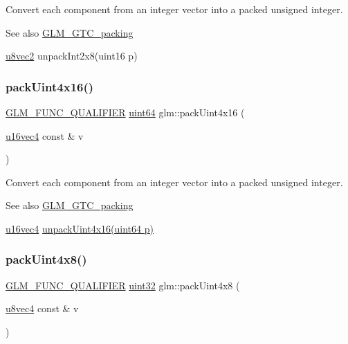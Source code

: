 Convert each component from an integer vector into a packed unsigned integer.

\begin{DoxySeeAlso}{See also}
\hyperlink{group__gtc__packing}{G\+L\+M\+\_\+\+G\+T\+C\+\_\+packing} 

\hyperlink{group__gtc__type__precision_ga01e28d0272428f94d22ea6111f0112be}{u8vec2} unpack\+Int2x8(uint16 p) 
\end{DoxySeeAlso}
\mbox{\label{group__gtc__packing_ga19813cb34dd7102f9612ba6c0d9ef377}} 
\subsubsection{\texorpdfstring{pack\+Uint4x16()}{packUint4x16()}}
{\footnotesize\ttfamily \hyperlink{setup_8hpp_a33fdea6f91c5f834105f7415e2a64407}{G\+L\+M\+\_\+\+F\+U\+N\+C\+\_\+\+Q\+U\+A\+L\+I\+F\+I\+ER} \hyperlink{group__gtc__type__precision_gae3632bf9b37da66233d78930dd06378a}{uint64} glm\+::pack\+Uint4x16 (\begin{DoxyParamCaption}\item[{\hyperlink{group__gtc__type__precision_ga049d45ad8d0f78578d7ceb86a7fdaae4}{u16vec4} const \&}]{v }\end{DoxyParamCaption})}

Convert each component from an integer vector into a packed unsigned integer.

\begin{DoxySeeAlso}{See also}
\hyperlink{group__gtc__packing}{G\+L\+M\+\_\+\+G\+T\+C\+\_\+packing} 

\hyperlink{group__gtc__type__precision_ga049d45ad8d0f78578d7ceb86a7fdaae4}{u16vec4} \hyperlink{group__gtc__packing_gaf1eea82404af955004aae19a2dcb55f1}{unpack\+Uint4x16(uint64 p)} 
\end{DoxySeeAlso}
\mbox{\label{group__gtc__packing_gaeb4262f799821affa62edf7067deaef9}} 
\subsubsection{\texorpdfstring{pack\+Uint4x8()}{packUint4x8()}}
{\footnotesize\ttfamily \hyperlink{setup_8hpp_a33fdea6f91c5f834105f7415e2a64407}{G\+L\+M\+\_\+\+F\+U\+N\+C\+\_\+\+Q\+U\+A\+L\+I\+F\+I\+ER} \hyperlink{group__gtc__type__precision_ga202b6a53c105fcb7e531f9b443518451}{uint32} glm\+::pack\+Uint4x8 (\begin{DoxyParamCaption}\item[{\hyperlink{group__gtc__type__precision_ga6c8841fa492bd5b1078b171452fd6974}{u8vec4} const \&}]{v }\end{DoxyParamCaption})}

